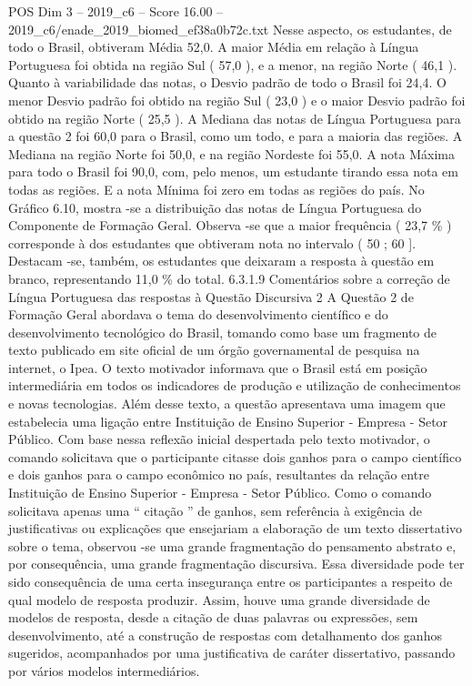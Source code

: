 \begin{textsample}{POS Dim 3 – 2019\_c6 – Score 16.00 – 2019\_c6/enade\_2019\_biomed\_ef38a0b72c.txt}
Nesse aspecto, os estudantes, de todo o Brasil, obtiveram Média 52,0.
A maior Média em relação à Língua Portuguesa foi obtida na região Sul ( 57,0 ), e a menor, na região Norte ( 46,1 ).
Quanto à variabilidade das notas, o Desvio padrão de todo o Brasil foi 24,4.
O menor Desvio padrão foi obtido na região Sul ( 23,0 ) e o maior Desvio padrão foi obtido na região Norte ( 25,5 ).
A Mediana das notas de Língua Portuguesa para a questão 2 foi 60,0 para o Brasil, como um todo, e para a maioria das regiões.
A Mediana na região Norte foi 50,0, e na região Nordeste foi 55,0.
A nota Máxima para todo o Brasil foi 90,0, com, pelo menos, um estudante tirando essa nota em todas as regiões.
E a nota Mínima foi zero em todas as regiões do país.
No Gráfico 6.10, mostra -se a distribuição das notas de Língua Portuguesa do Componente de Formação Geral.
Observa -se que a maior frequência ( 23,7 \% ) corresponde à dos estudantes que obtiveram nota no intervalo ( 50 ; 60 ].
Destacam -se, também, os estudantes que deixaram a resposta à questão em branco, representando 11,0 \% do total. 6.3.1.9 Comentários sobre a correção de Língua Portuguesa das respostas à Questão Discursiva 2 A Questão 2 de Formação Geral abordava o tema do desenvolvimento científico e do desenvolvimento tecnológico do Brasil, tomando como base um fragmento de texto publicado em site oficial de um órgão governamental de pesquisa na internet, o Ipea.
O texto motivador informava que o Brasil está em posição intermediária em todos os indicadores de produção e utilização de conhecimentos e novas tecnologias.
Além desse texto, a questão apresentava uma imagem que estabelecia uma ligação entre Instituição de Ensino Superior - Empresa - Setor Público.
Com base nessa reflexão inicial despertada pelo texto motivador, o comando solicitava que o participante citasse dois ganhos para o campo científico e dois ganhos para o campo econômico no país, resultantes da relação entre Instituição de Ensino Superior - Empresa - Setor Público.
Como o comando solicitava apenas uma “ citação ” de ganhos, sem referência à exigência de justificativas ou explicações que ensejariam a elaboração de um texto dissertativo sobre o tema, observou -se uma grande fragmentação do pensamento abstrato e, por consequência, uma grande fragmentação discursiva.
Essa diversidade pode ter sido consequência de uma certa insegurança entre os participantes a respeito de qual modelo de resposta produzir.
Assim, houve uma grande diversidade de modelos de resposta, desde a citação de duas palavras ou expressões, sem desenvolvimento, até a construção de respostas com detalhamento dos ganhos sugeridos, acompanhados por uma justificativa de caráter dissertativo, passando por vários modelos intermediários.

\end{textsample}
